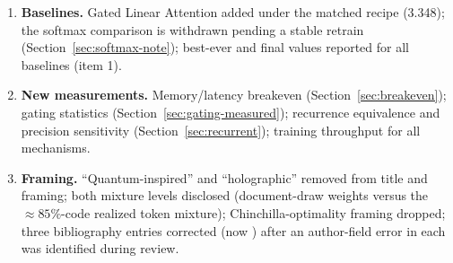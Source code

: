 \documentclass{article}
\begin{document}
\begin{enumerate}
\item \textbf{Baselines.} Gated Linear Attention added under the matched recipe (3.348); the softmax comparison is withdrawn pending a stable retrain (Section~\ref{sec:softmax-note}); best-ever and final values reported for all baselines (item 1).
\item \textbf{New measurements.} Memory/latency breakeven (Section~\ref{sec:breakeven}); gating statistics (Section~\ref{sec:gating-measured}); recurrence equivalence and precision sensitivity (Section~\ref{sec:recurrent}); training throughput for all mechanisms.
\item \textbf{Framing.} ``Quantum-inspired'' and ``holographic'' removed from title and framing; both mixture levels disclosed (document-draw weights versus the $\approx 85\%$-code realized token mixture); Chinchilla-optimality framing dropped; three bibliography entries corrected (now \cite{liutkus2021spe, qin2023lrpe, yu2025comrope, saratchandran2024rethinking}) after an author-field error in each was identified during review.
\end{enumerate}
\end{document}

